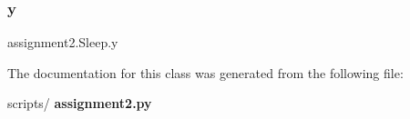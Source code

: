 \mbox{\label{classassignment2_1_1_sleep_a78714f82c5cd972c13640cc79bed7d49}} 
\subsubsection{y}
{\footnotesize\ttfamily assignment2.\+Sleep.\+y\hspace{0.3cm}{\ttfamily [static]}}



The documentation for this class was generated from the following file\+:\begin{DoxyCompactItemize}
\item 
scripts/\textbf{ assignment2.\+py}\end{DoxyCompactItemize}
